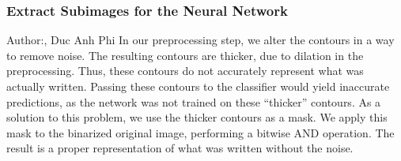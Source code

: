 \documentclass[12pt]{article}
\begin{document}
\subsubsection{Extract Subimages for the Neural Network}
\small{Author:, Duc Anh Phi} \newline \newline
In our preprocessing step, we alter the contours in a way to remove noise. The resulting contours are thicker, due to dilation in the preprocessing. Thus, these contours do not accurately represent what was actually written. Passing these contours to the classifier would yield inaccurate predictions, as the network was not trained on these “thicker” contours.
As a solution to this problem, we use the thicker contours as a mask. We apply this mask to the binarized original image, performing a bitwise AND operation. The result is a proper representation of what was written without the noise.
\end{document}
